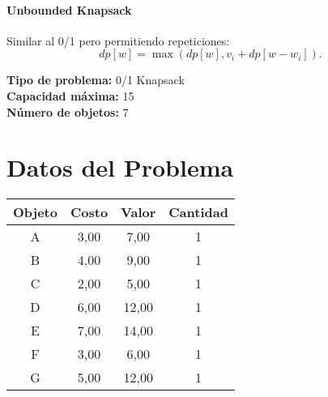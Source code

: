 \documentclass{article}
\begin{document}
\paragraph{Unbounded Knapsack} Similar al 0/1 pero permitiendo repeticiones:
\[
dp[w] = \max ( dp[w], v_i + dp[w - w_i] ).
\]

\thispagestyle{empty}
\newpage
\textbf{Tipo de problema:} 0/1 Knapsack\\
\textbf{Capacidad máxima:} 15\\
\textbf{Número de objetos:} 7\\

\section*{Datos del Problema}
\begin{tabular}{|c|c|c|c|}
\hline
Objeto & Costo & Valor & Cantidad \\
\hline
A & 3,00 & 7,00 & 1 \\
B & 4,00 & 9,00 & 1 \\
C & 2,00 & 5,00 & 1 \\
D & 6,00 & 12,00 & 1 \\
E & 7,00 & 14,00 & 1 \\
F & 3,00 & 6,00 & 1 \\
G & 5,00 & 12,00 & 1 \\
\hline
\end{tabular}
\end{document}
